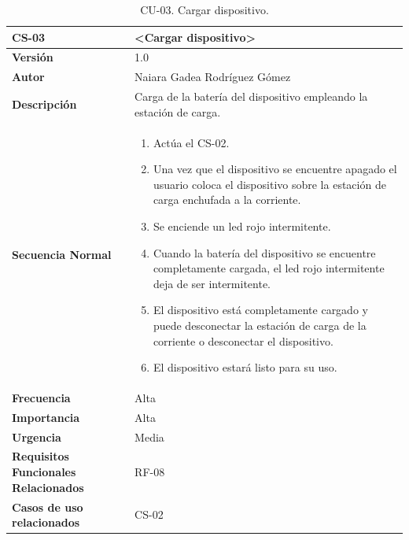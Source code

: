 \begin{table}[h!]%
\centering
\begin{tabular}{ |m{3cm}|m{11cm}|  } 
\hline
\cellcolor[HTML]{B9E3F0}\textbf{CS-03} & \cellcolor[HTML]{B9E3F0}\textbf{<Cargar dispositivo>}\\

\hline
\cellcolor[HTML]{EFEFEF}\textbf{Versión}             & 1.0  \\
\hline
\cellcolor[HTML]{EFEFEF}\textbf{Autor}                & Naiara Gadea Rodríguez Gómez\\
\hline
\cellcolor[HTML]{EFEFEF}\textbf{Descripción}                & {Carga de la batería del dispositivo empleando la estación de carga.}\\
\hline
\cellcolor[HTML]{EFEFEF}\textbf{Secuencia \newline Normal}                &                 
        \begin{enumerate}
			\def\labelenumi{\arabic{enumi}.}
			\tightlist
			\item Actúa el CS-02. 
			\item Una vez que el dispositivo se encuentre apagado el usuario coloca el dispositivo sobre la estación de carga enchufada a la corriente.
                \item Se enciende un led rojo intermitente.
                \item Cuando la batería del dispositivo se encuentre completamente cargada, el led rojo intermitente deja de ser intermitente.
                \item El dispositivo está completamente cargado y puede desconectar la estación de carga de la corriente o desconectar el dispositivo.
                \item El dispositivo estará listo para su uso.
		\end{enumerate}\\
\hline
\cellcolor[HTML]{EFEFEF}\textbf{Frecuencia}                & Alta\\
\hline
\cellcolor[HTML]{EFEFEF}\textbf{Importancia}                & Alta\\
\hline
\cellcolor[HTML]{EFEFEF}\textbf{Urgencia}                & Media\\
\hline
\cellcolor[HTML]{EFEFEF}\textbf{Requisitos Funcionales Relacionados}                & {RF-08}\\
\hline
\cellcolor[HTML]{EFEFEF}\textbf{Casos de uso relacionados}                & {CS-02}\\
\hline
\end{tabular}
\caption{CU-03. Cargar dispositivo.}
\end{table}

